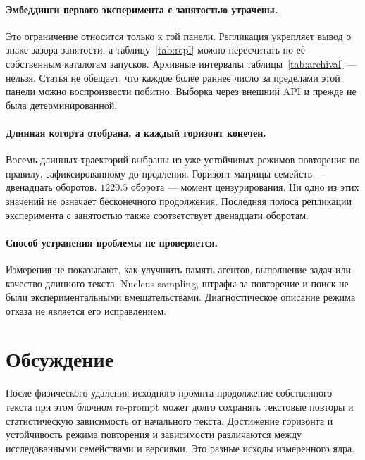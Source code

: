 \documentclass[10pt]{article}
\begin{document}
\paragraph{Эмбеддинги первого эксперимента с занятостью утрачены.}
Это ограничение относится только к той панели. %
Репликация укрепляет вывод о знаке зазора занятости,
а таблицу~\ref{tab:repl} можно пересчитать по её собственным каталогам запусков.
Архивные интервалы таблицы~\ref{tab:archival} --- нельзя.
Статья не обещает, что каждое более раннее число за пределами
этой панели можно воспроизвести побитно.
Выборка через внешний API и прежде не была детерминированной.

\paragraph{Длинная когорта отобрана, а каждый горизонт конечен.}
Восемь длинных траекторий выбраны из уже устойчивых режимов повторения
по правилу, зафиксированному до продления.
Горизонт матрицы семейств --- двенадцать оборотов. %
$1220.5$ оборота --- момент цензурирования. %
Ни одно из этих значений не означает бесконечного продолжения.
Последняя полоса репликации эксперимента с занятостью также соответствует
двенадцати оборотам.

\paragraph{Способ устранения проблемы не проверяется.}
Измерения не показывают, как улучшить память агентов,
выполнение задач или качество длинного текста.
Nucleus sampling, штрафы за повторение и поиск
не были экспериментальными вмешательствами.
Диагностическое описание режима отказа не является его исправлением.

\section{Обсуждение}
\label{sec:discussion}

После физического удаления исходного промпта продолжение собственного
текста при этом блочном re-prompt может долго сохранять текстовые повторы
и статистическую зависимость от начального текста.
Достижение горизонта и устойчивость режима повторения и зависимости
различаются между исследованными семействами и версиями.
Это разные исходы измеренного ядра.
\end{document}
